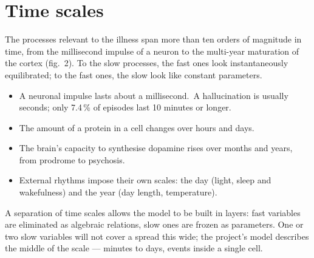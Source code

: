 \section{Time scales}
The processes relevant to the illness span more than ten orders of magnitude in time, from the millisecond impulse of a neuron to the multi-year maturation of the cortex (fig.~2). To the slow processes, the fast ones look instantaneously equilibrated; to the fast ones, the slow look like constant parameters.
\facts
\begin{itemize}
\item A neuronal impulse lasts about a millisecond.\tU\ A hallucination is usually seconds; only 7.4\,\% of episodes last 10 minutes or longer.\tS
\item The amount of a protein in a cell changes over hours and days.\tU
\item The brain's capacity to synthesise dopamine rises over months and years, from prodrome to psychosis.\tS
\item External rhythms impose their own scales: the day (light, sleep and wakefulness) and the year (day length, temperature).\tU
\end{itemize}
\begin{ineq}
A separation of time scales allows the model to be built in layers: fast variables are eliminated as algebraic relations, slow ones are frozen as parameters. One or two slow variables will not cover a spread this wide; the project's model describes the middle of the scale --- minutes to days, events inside a single cell.
\end{ineq}
